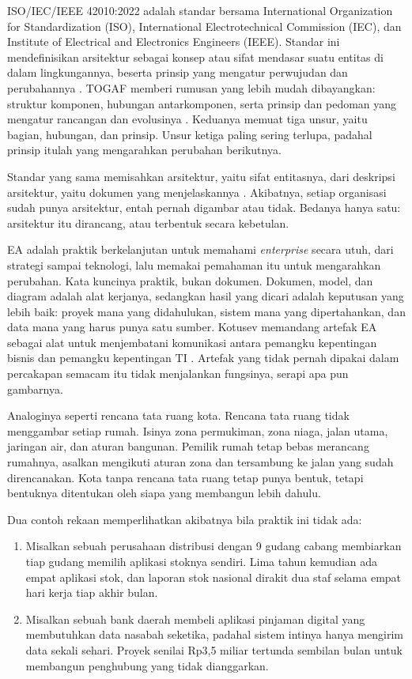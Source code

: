 ISO/IEC/IEEE 42010:2022 adalah standar bersama International Organization
for Standardization (ISO), International Electrotechnical Commission (IEC),
dan Institute of Electrical and Electronics Engineers (IEEE). Standar ini
mendefinisikan arsitektur sebagai konsep atau sifat mendasar suatu entitas di
dalam lingkungannya, beserta prinsip yang mengatur perwujudan dan
perubahannya \cite{iso42010}. TOGAF memberi rumusan yang lebih mudah
dibayangkan: struktur komponen, hubungan antarkomponen, serta prinsip dan
pedoman yang mengatur rancangan dan evolusinya \cite{togaf10}. Keduanya
memuat tiga unsur, yaitu bagian, hubungan, dan prinsip. Unsur ketiga paling
sering terlupa, padahal prinsip itulah yang mengarahkan perubahan berikutnya.

Standar yang sama memisahkan arsitektur, yaitu sifat entitasnya, dari
deskripsi arsitektur, yaitu dokumen yang menjelaskannya \cite{iso42010}.
Akibatnya, setiap organisasi sudah punya arsitektur, entah pernah digambar
atau tidak. Bedanya hanya satu: arsitektur itu dirancang, atau terbentuk
secara kebetulan.

EA adalah praktik berkelanjutan untuk memahami \textit{enterprise} secara
utuh, dari strategi sampai teknologi, lalu memakai pemahaman itu untuk
mengarahkan perubahan. Kata kuncinya praktik, bukan dokumen. Dokumen, model,
dan diagram adalah alat kerjanya, sedangkan hasil yang dicari adalah
keputusan yang lebih baik: proyek mana yang didahulukan, sistem mana yang
dipertahankan, dan data mana yang harus punya satu sumber. Kotusev memandang
artefak EA sebagai alat untuk menjembatani komunikasi antara pemangku
kepentingan bisnis dan pemangku kepentingan TI \cite{kotusev2019}. Artefak
yang tidak pernah dipakai dalam percakapan semacam itu tidak menjalankan
fungsinya, serapi apa pun gambarnya.

Analoginya seperti rencana tata ruang kota. Rencana tata ruang tidak
menggambar setiap rumah. Isinya zona permukiman, zona niaga, jalan utama,
jaringan air, dan aturan bangunan. Pemilik rumah tetap bebas merancang
rumahnya, asalkan mengikuti aturan zona dan tersambung ke jalan yang sudah
direncanakan. Kota tanpa rencana tata ruang tetap punya bentuk, tetapi
bentuknya ditentukan oleh siapa yang membangun lebih dahulu.

Dua contoh rekaan memperlihatkan akibatnya bila praktik ini tidak ada:

\begin{enumerate}
  \item Misalkan sebuah perusahaan distribusi dengan 9 gudang cabang
        membiarkan tiap gudang memilih aplikasi stoknya sendiri. Lima tahun
        kemudian ada empat aplikasi stok, dan laporan stok nasional dirakit
        dua staf selama empat hari kerja tiap akhir bulan.
  \item Misalkan sebuah bank daerah membeli aplikasi pinjaman digital yang
        membutuhkan data nasabah seketika, padahal sistem intinya hanya
        mengirim data sekali sehari. Proyek senilai Rp3,5 miliar tertunda
        sembilan bulan untuk membangun penghubung yang tidak dianggarkan.
\end{enumerate}

